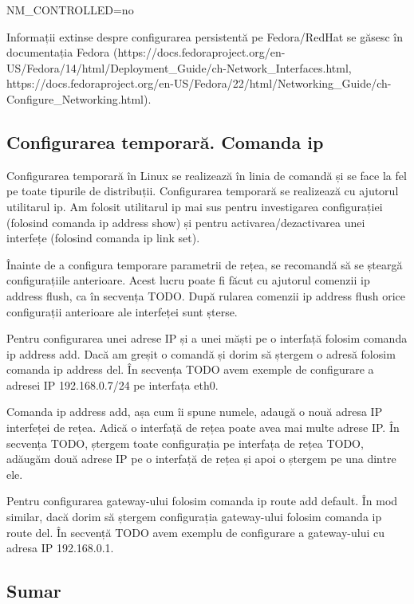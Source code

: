 NM_CONTROLLED=no

Informații extinse despre configurarea persistentă pe Fedora/RedHat se găsesc în documentația Fedora (https://docs.fedoraproject.org/en-US/Fedora/14/html/Deployment_Guide/ch-Network_Interfaces.html, https://docs.fedoraproject.org/en-US/Fedora/22/html/Networking_Guide/ch-Configure_Networking.html).

\subsection{Configurarea temporară. Comanda ip}
\label{sec:net:temporary-config}

Configurarea temporară în Linux se realizează în linia de comandă și se face la fel pe toate tipurile de distribuții. Configurarea temporară se realizează cu ajutorul utilitarul ip. Am folosit utilitarul ip mai sus pentru investigarea configurației (folosind comanda ip address show) și pentru activarea/dezactivarea unei interfețe (folosind comanda ip link set).

Înainte de a configura temporare parametrii de rețea, se recomandă să se șteargă configurațiile anterioare. Acest lucru poate fi făcut cu ajutorul comenzii ip address flush, ca în secvența TODO. După rularea comenzii ip address flush orice configurații anterioare ale interfeței sunt șterse.

Pentru configurarea unei adrese IP și a unei măști pe o interfață folosim comanda ip address add. Dacă am greșit o comandă și dorim să ștergem o adresă folosim comanda ip address del. În secvența TODO avem exemple de configurare a adresei IP 192.168.0.7/24 pe interfața eth0.

Comanda ip address add, așa cum îi spune numele, adaugă o nouă adresa IP interfeței de rețea. Adică o interfață de rețea poate avea mai multe adrese IP. În secvența TODO, ștergem toate configurația pe interfața de rețea TODO, adăugăm două adrese IP pe o interfață de rețea și apoi o ștergem pe una dintre ele.

Pentru configurarea gateway-ului folosim comanda ip route add default. În mod similar, dacă dorim să ștergem configurația gateway-ului folosim comanda ip route del. În secvență TODO avem exemplu de configurare a gateway-ului cu adresa IP 192.168.0.1.

\subsection{Sumar}
\label{sec:net:config-summary}

